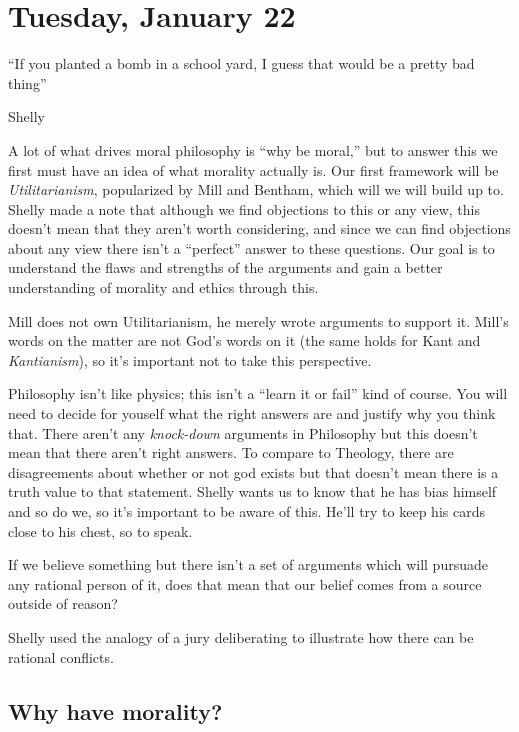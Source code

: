 
\section{Tuesday, January 22}

\epigraph{``If you planted a bomb in a school yard, I guess that would be a pretty bad thing''}{Shelly}

A lot of what drives moral philosophy is ``why be moral,'' but to answer this we first must have an idea of what morality actually is. Our first framework will be \emph{Utilitarianism}, popularized by Mill and Bentham, which will we will build up to. Shelly made a note that although we find objections to this or any view, this doesn't mean that they aren't worth considering, and since we can find objections about any view there isn't a ``perfect'' answer to these questions. Our goal is to understand the flaws and strengths of the arguments and gain a better understanding of morality and ethics through this.

Mill does not own Utilitarianism, he merely wrote arguments to support it. Mill's words on the matter are not God's words on it (the same holds for Kant and \emph{Kantianism}), so it's important not to take this perspective.

Philosophy isn't like physics; this isn't a ``learn it or fail'' kind of course. You will need to decide for youself what the right answers are and justify why you think that. There aren't any \emph{knock-down} arguments in Philosophy but this doesn't mean that there aren't right answers. To compare to Theology, there are disagreements about whether or not god exists but that doesn't mean there is a truth value to that statement. Shelly wants us to know that he has bias himself and so do we, so it's important to be aware of this. He'll try to keep his cards close to his chest, so to speak.

\begin{problem}
If we believe something but there isn't a set of arguments which will pursuade any rational person of it, does that mean that our belief comes from a source outside of reason?
\end{problem}

Shelly used the analogy of a jury deliberating to illustrate how there can be rational conflicts.

\subsection{Why have morality?}

